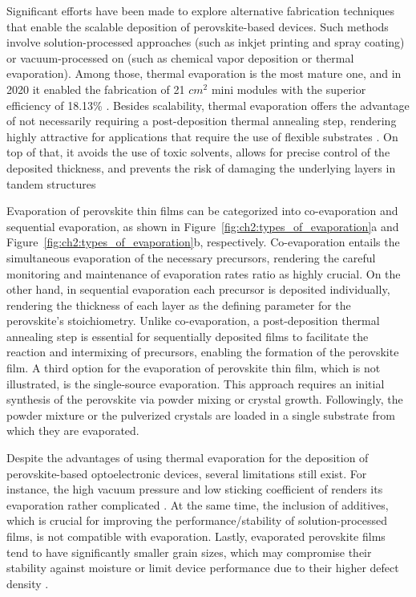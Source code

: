 Significant efforts have been made to explore alternative fabrication techniques that enable the scalable deposition of perovskite-based devices. Such methods involve solution-processed approaches (such as inkjet printing and spray coating) or vacuum-processed on (such as chemical vapor deposition or thermal evaporation). Among those, thermal evaporation is the most mature one, and in 2020 it enabled the fabrication of 21 $cm^2$ mini modules with the superior efficiency of 18.13\% \cite{Vaynzof2020TheProcessing, Li2020HighlyMini-modules}. Besides scalability, thermal evaporation offers the advantage of not necessarily requiring a post-deposition thermal annealing step, rendering highly attractive for applications that require the use of flexible substrates \cite{Becker2019LowExperimentation}. On top of that, it avoids the use of toxic solvents, allows for precise control of the deposited thickness, and prevents the risk of damaging the underlying layers in tandem structures \cite{Zhang2020TowardCells, Forgacs2017EfficientCells}

Evaporation of perovskite thin films can be categorized into co-evaporation and sequential evaporation, as shown in Figure~\ref{fig:ch2:types_of_evaporation}a and Figure~\ref{fig:ch2:types_of_evaporation}b, respectively. Co-evaporation entails the simultaneous evaporation of the necessary precursors, rendering the careful monitoring and maintenance of evaporation rates ratio as highly crucial. On the other hand, in sequential evaporation each precursor is deposited individually, rendering the thickness of each layer as the defining parameter for the perovskite's stoichiometry. Unlike co-evaporation, a post-deposition thermal annealing step is essential for sequentially deposited films to facilitate the reaction and intermixing of precursors, enabling the formation of the perovskite film. A third option for the evaporation of perovskite thin film, which is not illustrated, is the single-source evaporation. This approach requires an initial synthesis of the perovskite via powder mixing or crystal growth. Followingly, the powder mixture or the pulverized crystals are loaded in a single substrate from which they are evaporated. 


Despite the advantages of using thermal evaporation for the deposition of perovskite-based optoelectronic devices, several limitations still exist. For instance, the high vacuum pressure and low sticking coefficient of  renders its evaporation rather complicated \cite{Kim2020DepositionPerovskite}. At the same time, the inclusion of additives, which is crucial for improving the performance/stability of solution-processed films, is not compatible with evaporation. Lastly, evaporated perovskite films tend to have significantly smaller grain sizes, which may compromise their stability against moisture or limit device performance due to their higher defect density \cite{Vaynzof2020TheProcessing, Wang2017ScalingFilms}.


